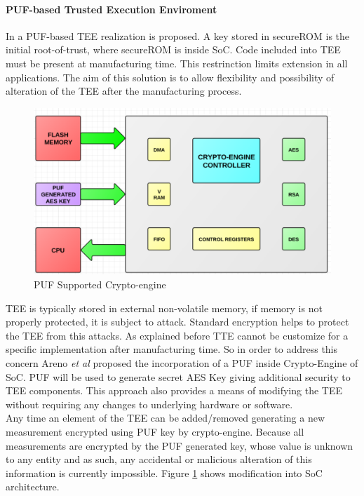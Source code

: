 \documentclass[../tesi.tex]{subfiles}
\begin{document}
{\paragraph{PUF-based Trusted Execution Enviroment} \label{par:TEE}
In \cite{areno2012securing} a PUF-based TEE realization is proposed. A key stored in secureROM is the initial root-of-trust, where secureROM is inside SoC. Code included into TEE must be present at manufacturing time. This restrinction limits extension in all applications. The aim of this solution is to allow flexibility and possibility of alteration of the TEE after the manufacturing process.
\begin{figure}
\centering
\includegraphics[scale=0.25]{images/teepuf.png}
\caption{PUF Supported Crypto-engine}
\label{fig:teeboot}
\end{figure}
TEE is typically stored in external non-volatile memory, if memory is not properly protected, it is subject to attack. Standard encryption helps to protect the TEE from this attacks. As explained before TTE cannot be customize for a specific implementation after manufacturing time. So in order to address this concern Areno \emph{et al} proposed the incorporation of a PUF inside Crypto-Engine of SoC. PUF will be used to generate secret AES Key giving additional security to TEE components. This approach also provides a means of modifying the TEE without requiring any changes to underlying hardware or software. \\
Any time an element of the TEE can be added/removed generating a new measurement encrypted using PUF key by crypto-engine. Because all measurements are encrypted by the PUF generated key, whose value is unknown to any entity and as such, any accidental or malicious alteration of this information is currently impossible. Figure \ref{fig:teeboot} shows modification into SoC architecture.  \\
}
\end{document}

